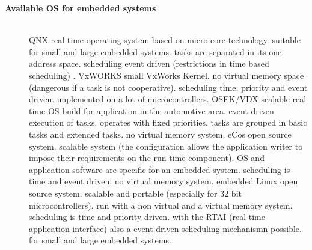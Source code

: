 \begin{description}
\item[{\rot\bf Available OS for embedded systems}]~\\[-3ex]
\bigskip
\bi
	\ite QNX
	\bi
		\ite real time operating system based on micro core technology.
		\ite suitable for small and large embedded systems.
		\ite tasks are separated in its one address space.
		\ite scheduling event driven (restrictions in time based scheduling) .
	\ei
	\bigskip
	\ite VxWORKS
	\bi
		\ite small VxWorks Kernel.
		\ite no virtual memory space (dangerous if a task is not cooperative).
		\ite scheduling time, priority and event driven.
		\ite implemented on a lot of microcontrollers.
	\ei
	\bigskip
	\ite OSEK/VDX
	\bi
		\ite scalable real time OS build for application in the automotive area.
		\ite event driven execution of tasks.
		\ite operates with fixed priorities.
		\ite tasks are grouped in basic tasks and extended tasks.
		\ite no virtual memory system.
	\ei
	\os{\newpage}
	\ite eCos
	\bi
		\ite open source system.
		\ite scalable system (the configuration allows the application writer to impose their requirements on the run-time component).
		\ite OS and application software are specific for an embedded system.
		\ite scheduling is time and event driven.
		\ite no virtual memory system.
	\ei
	\bigskip
	\ite embedded Linux
	\bi
		\ite open source system.
		\ite scalable and portable (especially for 32 bit microcontrollers).
		\ite run with a non virtual and a virtual memory system.
		\ite scheduling is time and priority driven.
		\ite with the RTAI (\underline{r}eal \underline{t}ime \underline{a}pplication \underline{i}nterface) also a event driven scheduling mechanismn possible.
		\ite for small and large embedded systems.
	\ei
\ei
\end{description}
\os{\newpage}

